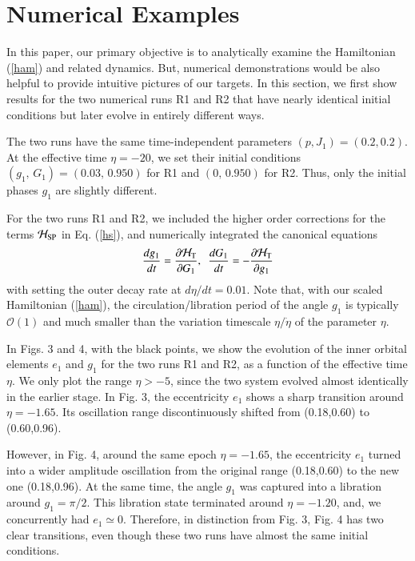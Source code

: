 \documentclass[useAMS,usenatbib,twocolumn]{mn2e}
\newcommand{\beq}{\begin{equation}}
\newcommand{\eeq}{\end{equation}}
\begin{document}
\section{Numerical Examples}
 In this paper,   our primary objective is to analytically examine the Hamiltonian
(\ref{ham})
and related dynamics.
But, numerical demonstrations would be also helpful to provide intuitive pictures of
our targets. 
In this section, we first show results for the two numerical runs R1 and R2 that have nearly identical initial conditions but later evolve in entirely different
ways.




The two runs have the same time-independent  parameters $(p,J_1)=(0.2,0.2)$.  At the effective time
$\eta=-20$, we set their initial conditions
$(g_{1},\, G_{1} )=(0.03,\, 0.950)$ for R1 and $(0,\, 0.950)$ for R2. 
Thus, only the initial phases $g_1$ are slightly  different.

For the two runs R1 and R2, we included the higher order corrections for the terms $\mathcal{H}_{\rm SP}$ in Eq. (\ref{hs}), and  numerically integrated the canonical equations 
\beq
\frac{dg_{1}}{dt}=\frac{\partial \mathcal{H}_{\rm T}}{\partial G_{1}},~~
\frac{dG_{1}}{dt}=-\frac{\partial \mathcal{H}_{\rm T}}{\partial g_{1}}\label{can}
\eeq
with setting the outer decay rate at $d\eta/dt=0.01$. Note that, with our scaled Hamiltonian (\ref{ham}),
the circulation/libration period of the angle $g_1$ is typically   $\mathcal{O}(1)$
and much smaller than 
the variation timescale $\eta/{\dot \eta}$ of the parameter $\eta$.  



In Figs. 3 and 4, with the black points, we show the evolution of 
the inner orbital elements $e_1$ and $g_1$ for the two runs R1 and R2,  as a function of the effective time $\eta$.
We only plot the range $\eta>-5$, since the two system evolved  almost identically
 in the earlier stage. 
In Fig. 3, the eccentricity $e_1$ shows a sharp transition around $\eta=-1.65$. 
Its oscillation range discontinuously shifted from (0.18,0.60) to (0.60,0.96).


However, in Fig. 4, around the same epoch $\eta=-1.65$, the eccentricity $e_1$ turned into a wider 
amplitude oscillation  from the original range (0.18,0.60) to  the new one (0.18,0.96).  At the same time, 
 the angle $g_1$ was captured into 
a libration around $g_1=\pi/2$.  This libration state terminated
 around $\eta=-1.20$, and, we concurrently  had 
$e_1\simeq 0$.  Therefore, in distinction from Fig. 3, Fig. 4 has two clear transitions, even though
these two runs  have almost the same initial conditions.
\end{document}

